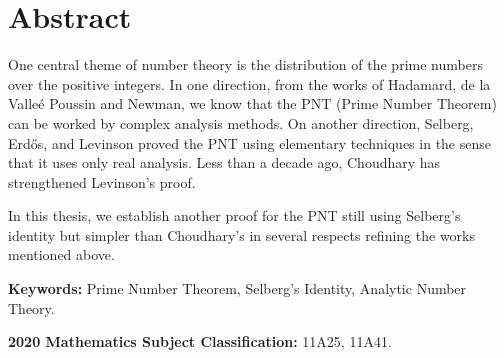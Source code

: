 \chapter*{Abstract}
One central theme of number theory is the distribution
of the prime numbers over the positive integers.
In one direction,
from the works of
Hadamard, de la Valle\'e Poussin and Newman,
we know that the PNT (Prime Number Theorem)
can be worked by complex analysis methods.
On another direction,
Selberg, Erdős, and Levinson proved the PNT
using elementary techniques in the sense that
it uses only real analysis.
Less than a decade ago,
Choudhary has strengthened Levinson's proof.

In this thesis,
we establish another proof for the PNT
still using Selberg's identity
but simpler than Choudhary's in several respects
refining the works mentioned above.

\bigskip
\textbf{Keywords:}
Prime Number Theorem,
Selberg's Identity,
Analytic Number Theory.

\bigskip
\textbf{2020 Mathematics Subject Classification:}
11A25,
11A41.
